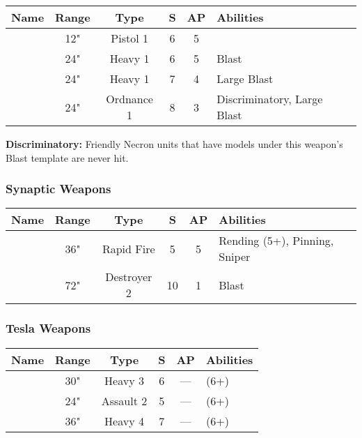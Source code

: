 \label{Particle Caster} \label{Particle Beamer} \label{Particle Shredder} \label{Particle Whip}
\noindent
\begin{NiceTabular}{m{130 pt} *{4}{c} >{\raggedright\arraybackslash}p{240pt}}
	Name & Range & Type & S & AP & Abilities \\
	\hline
	 & 12" & Pistol 1 & 6 & 5 & \\
	  & 24" & Heavy 1 & 6 & 5 & Blast \\
	 & 24" & Heavy 1 & 7 & 4 & Large Blast \\
	  & 24" & Ordnance 1 & 8 & 3 & Discriminatory, Large Blast \\
\end{NiceTabular}

\vspace*{1em}
\textbf{Discriminatory:} Friendly Necron units that have models under this weapon's Blast template are never hit.


\subsubsection{Synaptic Weapons}
\label{Synaptic Disintegrator}
\noindent
\begin{NiceTabular}{m{130 pt} *{4}{c} >{\raggedright\arraybackslash}p{240pt}}
	Name & Range & Type & S & AP & Abilities \\
	\hline
	 & 36" & Rapid Fire & 5 & 5 & Rending (5+), Pinning, Sniper \\	
	  & 72" & Destroyer 2 & 10 & 1 & Blast \\
\end{NiceTabular}

\subsubsection{Tesla Weapons}
\label{Tesla Cannon} \label{Tesla Carbine} \label{Tesla Destructor}
\noindent
\begin{NiceTabular}{m{130 pt} *{4}{c} >{\raggedright\arraybackslash}p{240pt}}
	Name & Range & Type & S & AP & Abilities \\
	\hline
	 & 30" & Heavy 3 & 6 & — &  (6+) \\
	  & 24" & Assault 2 & 5 & — &  (6+) \\	
	 & 36" & Heavy 4 & 7 & — &  (6+)
\end{NiceTabular}


